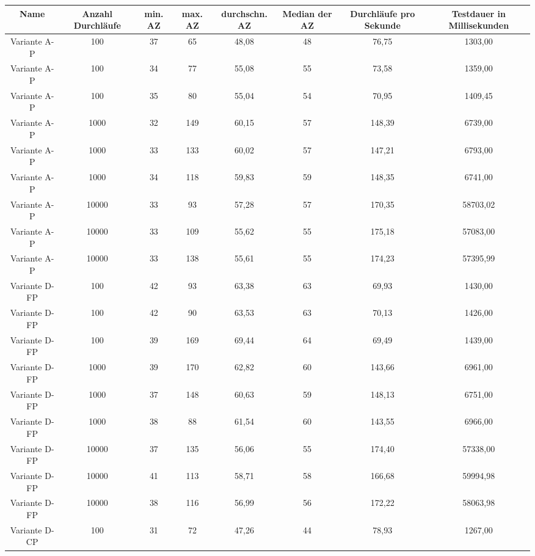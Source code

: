 \begin{anhang}
\begin{landscape}
	\begin{table}[h!]
		\centering
		\small
		\begin{tabular}{ |c|c|c|c|c|c|c|c|} 
			\hline
			Name & Anzahl Durchläufe & min. AZ & max. AZ & durchschn. AZ & Median der AZ & Durchläufe pro Sekunde & Testdauer in Millisekunden \\ 
			\hline
			Variante A-P & 100 & 37 & 65 & 48,08 & 48 & 76,75 & 1303,00 \\
			\hline
			Variante A-P & 100 & 34 & 77 & 55,08 & 55 & 73,58 & 1359,00 \\
			\hline
			Variante A-P & 100 & 35 & 80 & 55,04 & 54 & 70,95 & 1409,45 \\
			\hline
			Variante A-P & 1000 & 32 & 149 & 60,15 & 57 & 148,39 & 6739,00 \\
			\hline
			Variante A-P & 1000 & 33 & 133 & 60,02 & 57 & 147,21 & 6793,00 \\
			\hline
			Variante A-P & 1000 & 34 & 118 & 59,83 & 59 & 148,35 & 6741,00 \\
			\hline
			Variante A-P & 10000 & 33 & 93 & 57,28 & 57 & 170,35 & 58703,02 \\
			\hline
			Variante A-P & 10000 & 33 & 109 & 55,62 & 55 & 175,18 & 57083,00 \\
			\hline
			Variante A-P & 10000 & 33 & 138 & 55,61 & 55 & 174,23 & 57395,99 \\
			\hline
			Variante D-FP & 100 & 42 & 93 & 63,38 & 63 & 69,93 & 1430,00 \\
			\hline
			Variante D-FP & 100 & 42 & 90 & 63,53 & 63 & 70,13 & 1426,00 \\
			\hline
			Variante D-FP & 100 & 39 & 169 & 69,44 & 64 & 69,49 & 1439,00 \\
			\hline
			Variante D-FP & 1000 & 39 & 170 & 62,82 & 60 & 143,66 & 6961,00 \\
			\hline
			Variante D-FP & 1000 & 37 & 148 & 60,63 & 59 & 148,13 & 6751,00 \\
			\hline
			Variante D-FP & 1000 & 38 & 88 & 61,54 & 60 & 143,55 & 6966,00 \\
			\hline
			Variante D-FP & 10000 & 37 & 135 & 56,06 & 55 & 174,40 & 57338,00 \\
			\hline
			Variante D-FP & 10000 & 41 & 113 & 58,71 & 58 & 166,68 & 59994,98 \\
			\hline
			Variante D-FP & 10000 & 38 & 116 & 56,99 & 56 & 172,22 & 58063,98 \\
			\hline
			Variante D-CP & 100 & 31 & 72 & 47,26 & 44 & 78,93 & 1267,00 \\

\end{tabular}
\end{table}
\end{landscape}
\end{anhang}
